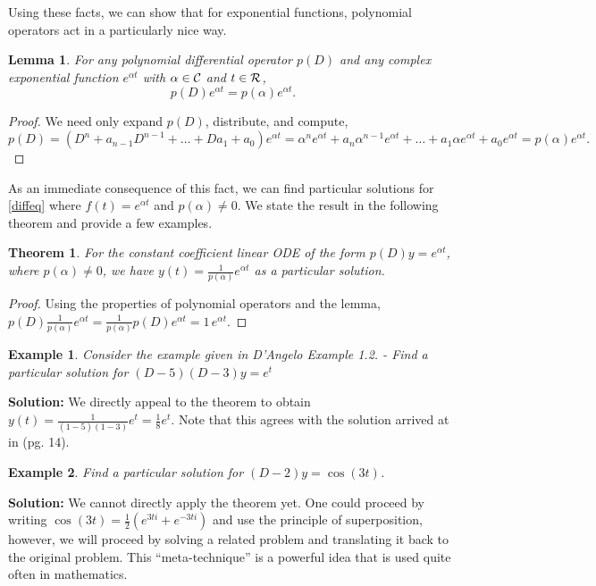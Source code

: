 \documentclass{amsart} %
\newtheorem{lemma}{Lemma}
\newtheorem{thm}{Theorem}
\newtheorem{ex}{Example}
\begin{document}
Using these facts, we can show that for exponential functions, polynomial operators act in a particularly nice way.
\begin{lemma}
  For any polynomial differential operator $p(D)$ and any complex exponential function $e^{\alpha t}$ with $\alpha \in \mathcal C$ and $t \in \mathcal R$, 
  $$
  p(D) e^{\alpha t} = p(\alpha) e^{\alpha t}.
  $$
\end{lemma}
\begin{proof}
  We need only expand $p(D)$, distribute, and compute,
  $$
    p(D) = (D^n + a_{n-1}D^{n-1} + \dots + Da_1 + a_0) e^{\alpha t} = \alpha^n e^{\alpha t} + a_n \alpha^{n-1} e^{\alpha t} + \dots + a_1 \alpha e^{\alpha t} + a_0 e^{\alpha t} = p(\alpha) e^{\alpha t}.
  $$
\end{proof}

As an immediate consequence of this fact, we can find particular solutions for \eqref{diffeq} where $f(t) = e^{\alpha t}$ and $p(\alpha) \not=0$.  We state the result in the following theorem and provide a few examples.

\begin{thm}
  For the constant coefficient linear ODE of the form $p(D) y = e^{\alpha t}$, where $p(\alpha) \not=0$, we have $y(t) = \frac{1}{p(\alpha)} e^{\alpha t}$ as a particular solution.
\end{thm}
\begin{proof}
  Using the properties of polynomial operators and the lemma, $p(D) \frac{1}{p(\alpha)} e^{\alpha t} = \frac{1}{p(\alpha)} p(D) e^{\alpha t} = 1 \, e^{\alpha t}$.
\end{proof}

\begin{ex} 
  Consider the example given in \emph{D'Angelo Example 1.2.} - Find a particular solution for $(D-5)(D-3)y = e^t$
\end{ex}
{\bf Solution:}
  We directly appeal to the theorem to obtain $y(t) = \frac{1}{(1-5)(1-3)} e^{t} = \frac 18 e^t$. Note that this agrees with the solution arrived at in \cite{dangelo} (pg. 14). 

\begin{ex}
  Find a particular solution for $(D - 2) y = \cos(3t)$.
\end{ex}
{\bf Solution:}
We cannot directly apply the theorem yet.  One could proceed by writing
$\cos(3t) = \frac 12 (e^{3ti} + e^{-3ti})$ and use the principle of
superposition, however, we will proceed by solving a related problem and translating it back to the original problem.  This ``meta-technique'' is a powerful idea that is used quite often in mathematics.
\end{document}
